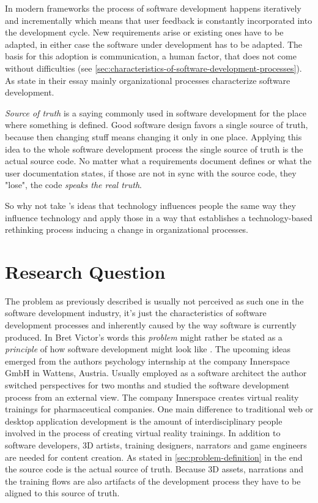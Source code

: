 In modern frameworks the process of software development happens iteratively and incrementally \autocite{mayr_projekt_2005} which means that user feedback is constantly incorporated into the development cycle.
New requirements arise or existing ones have to be adapted, in either case the software under development has to be adapted.
The basis for this adoption is communication, a human factor, that does not come without difficulties (see \cref{sec:characteristics-of-software-development-processes}).
As \citeauthor{curtis_psychology_1990} state in their essay \textcite{curtis_psychology_1990} mainly organizational processes characterize software development.

\emph{Source of truth} is a saying commonly used in software development for the place where something is defined.
Good software design favors a single source of truth, because then changing stuff means changing it only in one place.
Applying this idea to the whole software development process the single source of truth is the actual source code.
No matter what a requirements document defines or what the user documentation states, if those are not in sync with the source code, they "lose", the code \emph{speaks the real truth}.

So why not take \citeauthor{schraube_ich_2012}'s ideas \autocite{schraube_ich_2012} that technology influences people the same way they influence technology and apply those in a way that establishes a technology-based rethinking process inducing a change in organizational processes.


\section{Research Question}
The problem as previously described is usually not perceived as such one in the software development industry, it's just the characteristics of software development processes and inherently caused by the way software is currently produced.
In Bret Victor's words this \emph{problem} might rather be stated as a \emph{principle} of how software development might look like \autocite{victor_inventing_2012}.
The upcoming ideas emerged from the authors psychology internship at the company Innerspace GmbH in Wattens, Austria.
Usually employed as a software architect the author switched perspectives for two months and studied the software development process from an external view.
The company Innerspace creates virtual reality trainings for pharmaceutical companies.
One main difference to traditional web or desktop application development is the amount of interdisciplinary people involved in the process of creating virtual reality trainings.
In addition to software developers, 3D artists, training designers, narrators and game engineers are needed for content creation.
As stated in \cref{sec:problem-definition} in the end the source code is the actual source of truth.
Because 3D assets, narrations and the training flows are also artifacts of the development process they have to be aligned to this source of truth.

